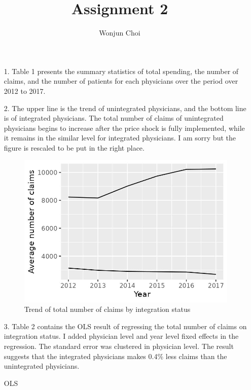 \documentclass[12pt]{article}
\title{Assignment 2}
\author{Wonjun Choi}
\begin{document}
\maketitle
	\begin{itemize}
		\item[1.] Table 1 presents the summary statistics of total spending, the number of claims, and the number of patients for each physicians over the period over 2012 to 2017.
		
		
		
		\item[2.] The upper line is the trend of unintegrated physicians, and the bottom line is of integrated physicians. The total number of claims of unintegrated physicians begins to increase after the price shock is fully implemented, while it remains in the similar level for integrated physicians. I am sorry but the figure is rescaled to be put in the right place.
		\begin{figure} [ht]
			\centering
			\includegraphics[scale=0.2]{fig_claim_by_int.jpg}
			\caption{Trend of total number of claims by integration status}
		\end{figure}
		
		\item[3.] Table 2 contains the OLS result of regressing the total number of claims on integration status. I added physician level and year level fixed effects in the regression. The standard error was clustered in physician level. The result suggests that the integrated physicians makes 0.4\% less claims than the unintegrated physicians.
		
		\begin{table} [ht]
	    
	    \caption{OLS}
		\end{table}


\end{itemize}
\end{document}
